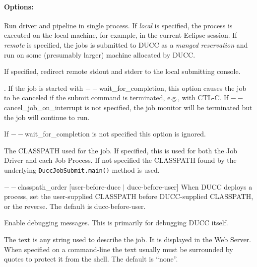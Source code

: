         \paragraph{Options:}
           \begin{description}

           \item[$--$all\_in\_one $<$local $|$ remote $>$]
               Run driver and pipeline in single process.  If {\em local} is specified, the
               process is executed on the local machine, for example, in the current Eclipse session.
               If {\em remote} is specified, the jobs is submitted to DUCC as a {\em manged reservation}
               and run on some (presumably larger) machine allocated by DUCC.

           \item[$--$attach\_console] If specified, redirect remote stdout and stderr
             to the local submitting console.

           \item[$--$cancel\_on\_interrupt].  If the job is started with $--$wait\_for\_completion, this
             option causes the job to be canceled if the submit command is terminated,
             e.g., with CTL-C. If $--$cancel\_job\_on\_interrupt is not
             specified, the job monitor will be terminated but the job will continue to run.

             If $--$wait\_for\_completion is not specified this option is ignored. 

           \item[$--$classpath] The CLASSPATH used for the job.  If specified, this is used
             for both the Job Driver and each Job Process. If not specified the CLASSPATH found by the underlying
             {\tt DuccJobSubmit.main()} method is used.

           \begin{sloppypar}
           \item[$--$classpath\_order {[user-before-ducc $|$ ducc-before-user]} ]
             When DUCC deploys a process, set the user-supplied CLASSPATH before DUCC-supplied
             CLASSPATH, or the reverse. The default is ducc-before-user.
           \end{sloppypar}
           
           \item[$--$debug] Enable debugging messages. This is primarily for debugging DUCC itself.

           \item[$--$description {[text]}] The text is any string used to describe the job. It is
             displayed in the Web Server. When specified on a command-line the text usually 
             must be surrounded by quotes to protect it from the shell.  The default is ``none''.


\end{description}
